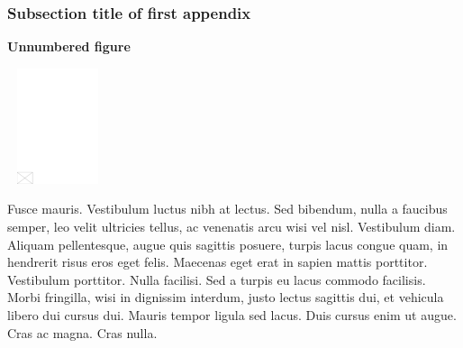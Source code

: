 \documentclass[AMS,STIX2COL]{WileyNJD-v2}
\begin{document}
    \subsubsection{Subsection title of first appendix\label{app1.1.1a}}

    \noindent\textbf{Unnumbered figure}


    \begin{center}
        \includegraphics[width=7pc,height=8pc,draft]{empty}
    \end{center}


    Fusce mauris. Vestibulum luctus nibh at lectus. Sed bibendum, nulla a faucibus semper, leo velit ultricies tellus, ac
    venenatis arcu wisi vel nisl. Vestibulum diam. Aliquam pellentesque, augue quis sagittis posuere, turpis lacus congue
    quam, in hendrerit risus eros eget felis. Maecenas eget erat in sapien mattis porttitor. Vestibulum porttitor. Nulla
    facilisi. Sed a turpis eu lacus commodo facilisis. Morbi fringilla, wisi in dignissim interdum, justo lectus sagittis dui, et
    vehicula libero dui cursus dui. Mauris tempor ligula sed lacus. Duis cursus enim ut augue. Cras ac magna. Cras nulla.
\end{document}

